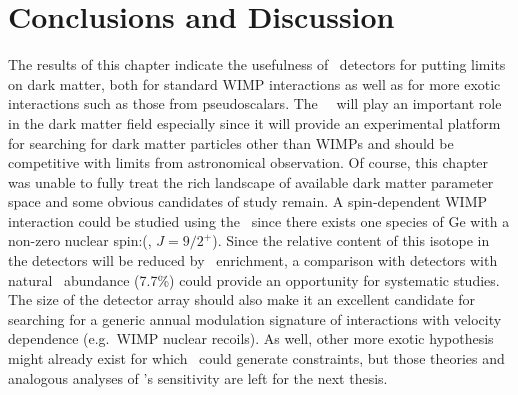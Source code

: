 	\section{Conclusions and Discussion}
	\label{sec:OtherLowEnergyConclusions}	
	
	The results of this chapter indicate the usefulness of \ppc~detectors for putting limits on dark matter, both for standard WIMP interactions as well as for more exotic interactions such as those from pseudoscalars.  The \MJ~\minmod~will play an important role in the dark matter field especially since it will provide an experimental platform for searching for dark matter particles other than WIMPs and should be competitive with limits from astronomical observation.  Of course, this chapter was unable to fully treat the rich landscape of available dark matter parameter space and some obvious candidates of study remain.  A spin-dependent WIMP interaction could be studied using the \minmod~since there exists one species of Ge with a non-zero nuclear spin:(\gerseventhree, $J=9/2^{+}$).  Since the relative content of this isotope in the detectors will be reduced by \gersevensix~enrichment, a comparison with detectors with natural \gerseventhree~abundance (7.7\%) could provide an opportunity for systematic studies.  The size of the detector array should also make it an excellent candidate for searching for a generic annual modulation signature of interactions with velocity dependence (e.g.~WIMP nuclear recoils).  As well, other more exotic hypothesis might already exist for which \MJ~could generate constraints, but those theories and analogous analyses of \MJ's sensitivity are left for the next thesis.
	
